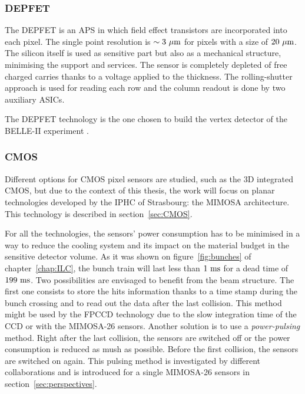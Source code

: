    \subsubsection{DEPFET}
    
    The \gls{DEPFET} \cite{Richter2003} is an \gls{APS} in which field effect transistors are incorporated into each pixel.
    The single point resolution is $\sim 3~\rm{\mu m}$ for pixels with a size of $20~\rm{\mu m}$.
    The silicon itself is used as sensitive part but also as a mechanical structure, minimising the support and services.
    The sensor is completely depleted of free charged carries thanks to a voltage applied to the thickness.
    The rolling-shutter approach is used for reading each row and the column readout is done by two auxiliary \glspl{ASIC}.

    The \gls{DEPFET} technology is the one chosen  to build the vertex detector of the BELLE-II experiment \cite{depfetBelleII}.

   \subsubsection{CMOS}

   Different options for \gls{CMOS} pixel sensors are studied, such as the 3D integrated \gls{CMOS}, but due to the context of this thesis, the work will focus on planar technologies developed by the \gls{IPHC} of Strasbourg: the \gls{MIMOSA} architecture. 
   This technology is described in section~\ref{sec:CMOS}.

   For all the technologies, the sensors' power consumption has to be minimised in a way to reduce the cooling system and its impact on the material budget in the sensitive detector volume.
   As it was shown on figure~\ref{fig:bunches} of chapter~\ref{chap:ILC}, the bunch train will last less than $1~\rm{ms}$ for a dead time of $199~\rm{ms}$.
   Two possibilities are envisaged to benefit from the beam structure.
   The first one consists to store the hits information thanks to a time stamp during the bunch crossing and to read out the data after the last collision.
   This method might be used by the \gls{FPCCD} technology due to the slow integration time of the \gls{CCD} or with the \gls{MIMOSA}-26 sensors.
   Another solution is to use a \textit{power-pulsing} method.
   Right after the last collision, the sensors are switched off or the power consumption is reduced as mush as possible.
   Before the first collision, the sensors are switched on again.
   This pulsing method is investigated by different collaborations and is introduced for a single \gls{MIMOSA}-26 sensors in section~\ref{sec:perspectives}. 
   
